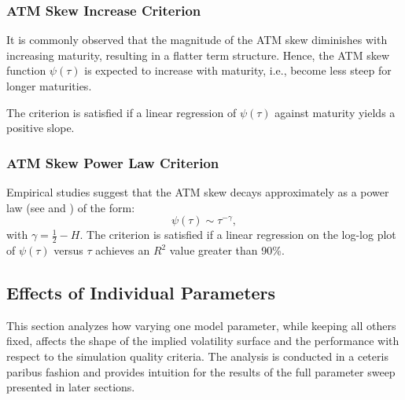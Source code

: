 \subsubsection*{ATM Skew Increase Criterion}
It is commonly observed that the magnitude of the ATM skew diminishes with increasing maturity, resulting in a flatter term structure. Hence, the ATM skew function $\psi(\tau)$ is expected to increase with maturity, i.e., become less steep for longer maturities.

The criterion is satisfied if a linear regression of $\psi(\tau)$ against maturity yields a positive slope.

\subsubsection*{ATM Skew Power Law Criterion}
Empirical studies suggest that the ATM skew decays approximately as a power law (see \citealp{Fukasawa2011} and \citealp{GatheralJaissonRosenbaum2018}) of the form:
\begin{equation} \label{eq:PowerLaw}
    \psi(\tau) \sim \tau^{-\gamma},
\end{equation}
with $\gamma = \tfrac{1}{2} - H$. The criterion is satisfied if a linear regression on the log-log plot of $\psi(\tau)$ versus $\tau$ achieves an $R^2$ value greater than 90\%.


\subsection{Effects of Individual Parameters} \label{subsec:IndividualParameterEffects}

This section analyzes how varying one model parameter, while keeping all others fixed, affects the shape of the implied volatility surface and the performance with respect to the simulation quality criteria. The analysis is conducted in a ceteris paribus fashion and provides intuition for the results of the full parameter sweep presented in later sections.

